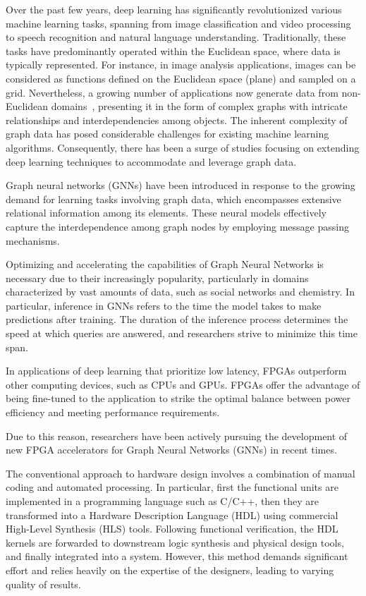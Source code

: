 Over the past few years, deep learning has significantly revolutionized various machine learning tasks,
spanning from image classification and video processing to speech recognition and natural language understanding.
Traditionally, these tasks have predominantly operated within the Euclidean space, where data is typically
represented.
For instance, in image analysis applications, images can be considered as functions defined on the Euclidean space (plane) and sampled on a grid.
Nevertheless, a growing number of applications now generate data from non-Euclidean domains~\cite{DBLP:journals/corr/BronsteinBLSV16},
presenting it in the form of complex graphs with intricate relationships and interdependencies among objects.
The inherent complexity of graph data has posed considerable challenges for existing machine learning algorithms.
Consequently, there has been a surge of studies focusing on extending deep learning techniques to accommodate
and leverage graph data.

Graph neural networks (GNNs) have been introduced in response to the growing demand for learning tasks involving
graph data, which encompasses extensive relational information among its elements.
These neural models effectively capture the interdependence among graph nodes by employing message passing mechanisms.

Optimizing and accelerating the capabilities of Graph Neural Networks is necessary due to their increasingly popularity, particularly in domains characterized by vast amounts of data,
such as social networks and chemistry.
In particular, inference in GNNs refers to the time the model takes to make predictions after training.
The duration of the inference process determines the speed at which queries are answered, and researchers strive to minimize this time span.

In applications of deep learning that prioritize low latency, FPGAs outperform other computing devices, such as CPUs and GPUs.
FPGAs offer the advantage of being fine-tuned to the application to strike the optimal balance between power efficiency and meeting performance requirements.

Due to this reason, researchers have been actively pursuing the development of new FPGA accelerators for Graph Neural Networks (GNNs) in recent times.

The conventional approach to hardware design involves a combination of manual coding and automated processing.
In particular, first the functional units are implemented in a programming language such as C/C++, then they are transformed into a Hardware Description Language (HDL) using commercial High-Level Synthesis (HLS) tools.
Following functional verification, the HDL kernels are forwarded to downstream logic synthesis and physical design tools, and finally integrated into a system.
However, this method demands significant effort and relies heavily on the expertise of the designers, leading to varying quality of results.

